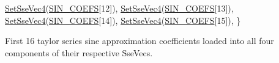 \begin{DoxyCode}
        \hyperlink{namespacegfxmath_a8ceb1c8310eb6cbeec062c9a2d73322e}{SetSseVec4}(\hyperlink{group___scalar_math_consts_gaf9ed3a0307a3da747c8515d9719f28eb}{SIN\_COEFS}[12]), 
        \hyperlink{namespacegfxmath_a8ceb1c8310eb6cbeec062c9a2d73322e}{SetSseVec4}(\hyperlink{group___scalar_math_consts_gaf9ed3a0307a3da747c8515d9719f28eb}{SIN\_COEFS}[13]), 
        \hyperlink{namespacegfxmath_a8ceb1c8310eb6cbeec062c9a2d73322e}{SetSseVec4}(\hyperlink{group___scalar_math_consts_gaf9ed3a0307a3da747c8515d9719f28eb}{SIN\_COEFS}[14]), 
        \hyperlink{namespacegfxmath_a8ceb1c8310eb6cbeec062c9a2d73322e}{SetSseVec4}(\hyperlink{group___scalar_math_consts_gaf9ed3a0307a3da747c8515d9719f28eb}{SIN\_COEFS}[15]), 
    \}
\end{DoxyCode}


First 16 taylor series sine approximation coefficients loaded into all four components of their respective Sse\+Vecs. 

